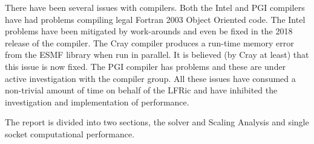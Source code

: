 \documentclass[11pt]{article}
\begin{document}
There have been several issues with compilers. Both the Intel and PGI
compilers have had problems compiling legal Fortran 2003 Object
Oriented code. The Intel problems have been mitigated by work-arounds
and even be fixed in the 2018 release of the compiler. The Cray
compiler produces a run-time memory error from the ESMF library when
run in parallel. It is believed (by Cray at least) that this issue is
now fixed. The PGI compiler has problems and these are under active
investigation with the compiler group. All these issues have consumed
a non-trivial amount of time on behalf of the LFRic and have inhibited
the investigation and implementation of performance.

The report is divided into two sections, the solver and Scaling
Analysis and single socket computational performance.


\end{document}
